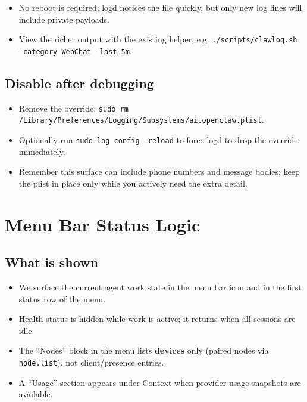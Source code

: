 \begin{itemize}
  \item No reboot is required; logd notices the file quickly, but only new log lines will include private payloads.
  \item View the richer output with the existing helper, e.g. \texttt{./scripts/clawlog.sh --category WebChat --last 5m}.
\end{itemize}


\subsection{Disable after debugging}


\begin{itemize}
  \item Remove the override: \texttt{sudo rm /Library/Preferences/Logging/Subsystems/ai.openclaw.plist}.
  \item Optionally run \texttt{sudo log config --reload} to force logd to drop the override immediately.
  \item Remember this surface can include phone numbers and message bodies; keep the plist in place only while you actively need the extra detail.
\end{itemize}



\clearpage

\section{Menu Bar Status Logic}


\subsection{What is shown}


\begin{itemize}
  \item We surface the current agent work state in the menu bar icon and in the first status row of the menu.
  \item Health status is hidden while work is active; it returns when all sessions are idle.
  \item The “Nodes” block in the menu lists \textbf{devices} only (paired nodes via \texttt{node.list}), not client/presence entries.
  \item A “Usage” section appears under Context when provider usage snapshots are available.
\end{itemize}


